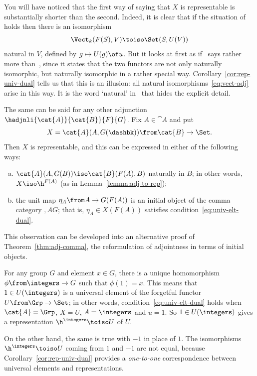 \begin{example}
You will have noticed that the first way of saying that $X$ is representable
is substantially shorter than the second.  Indeed, it is clear that if the
situation of~ holds then there is an isomorphism
\[
\Vect_k(F(S), V) \toiso \Set(S, U(V))
\]
natural in $V$, defined by $g \mapsto U(g) \of u$.  But it looks at first
as if~ says rather more
than~, since it states that the two functors are
not only naturally isomorphic, but naturally isomorphic in a rather special
way.  Corollary~\ref{cor:rep-univ-dual} tells us that this is an illusion:
all natural isomorphisms~\eqref{eq:vect-adj} arise in this way.  It is the
word `natural'%
%
%
in~ that hides the explicit detail.
\end{example}

\begin{example}
The same can be said for any other adjunction
$\hadjnli{\cat{A}}{\cat{B}}{F}{G}$.  Fix $A \in \cat{A}$ and put
\[
X = \cat{A}(A, G(\dashbk))\from
\cat{B} \to \Set.
\]
Then $X$ is representable, and this can be expressed in either of the
following ways:
% 
\begin{enumerate}[(b)]
\item 
$\cat{A}(A, G(B)) \iso \cat{B}(F(A), B)$ naturally in $B$; in other words,
$X \iso \h^{F(A)}$ (as in Lemma~\ref{lemma:adj-to-rep});

\item 
the unit map $\eta_A\from A \to G(F(A))$ is an initial object of the comma
category $\comma{A}{G}$; that is, $\eta_A \in X(F(A))$ satisfies
condition~\eqref{eq:univ-elt-dual}. 
\end{enumerate}
% 
This observation can be developed into an alternative proof of
Theorem~\ref{thm:adj-comma}, the reformulation of adjointness%
%
%
in terms of initial objects.
\end{example}

\begin{example} 
\label{eg:gp-fgt-rep}
For any group%
%
%
$G$ and element $x \in G$, there is a unique homomorphism $\phi\from
\integers \to G$%
%
%
 such that $\phi(1) = x$.  This means that $1 \in
U(\integers)$ is a universal element of the forgetful functor $U\from \Grp
\to \Set$; in other words, condition~\eqref{eq:univ-elt-dual} holds when
$\cat{A} = \Grp$, $X = U$, $A = \integers$ and $u = 1$.  So $1 \in
U(\integers)$ gives a representation $\h^{\integers} \toiso U$ of $U$.

On the other hand, the same is true with $-1$ in place of $1$.  The
isomorphisms $\h^{\integers} \toiso U$ coming from $1$ and $-1$ are not
equal, because Corollary~\ref{cor:rep-univ-dual} provides a \emph{one-to-one}
correspondence between universal elements and representations.
\end{example}
%
%

